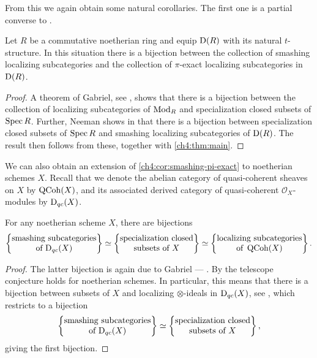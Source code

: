 
From this we again obtain some natural corollaries. The first one is a partial converse to \cite[2.13]{takahashi_2009}.

\begin{corollary}
    \label{ch4:cor:smashing-pi-exact}
    Let $R$ be a commutative noetherian ring and equip $\mathrm{D}(R)$ with its natural $t$-structure. In this situation there is a bijection between the collection of smashing localizing subcategories and the collection of $\pi$-exact localizing subcategories in $\mathrm{D}(R)$. 
\end{corollary}
\begin{proof}
    A theorem of Gabriel, see \cite[VI.2.4(b)]{gabriel_1962}, shows that there is a bijection between the collection of localizing subcategories of $\mathrm{Mod}_R$ and specialization closed subsets of $\operatorname{Spec} R$. Further, Neeman shows in \cite[3.3]{neeman_1992} that there is a bijection between specialization closed subsets of $\operatorname{Spec} R$ and smashing localizing subcategories of $\mathrm{D}(R)$. The result then follows from these, together with \cref{ch4:thm:main}. 
\end{proof}

We can also obtain an extension of \cref{ch4:cor:smashing-pi-exact} to noetherian schemes $X$. Recall that we denote the abelian category of quasi-coherent sheaves on $X$ by $\operatorname{QCoh}(X)$, and its associated derived category of quasi-coherent $\mathcal{O}_X$-modules by $\mathrm{D}_{qc}(X)$. 

\begin{lemma}
    For any noetherian scheme $X$, there are bijections
    \[\left\{ \begin{matrix} \text{smashing subcategories}\\ \text{of }\mathrm{D}_{qc}(X) \end{matrix} \right\}\simeq \left\{ \begin{matrix} \text{specialization closed}\\ \text{subsets of }X \end{matrix} \right\} \simeq \left\{ \begin{matrix} \text{localizing subcategories}\\ \text{of }\operatorname{QCoh}(X) \end{matrix} \right\}.\]
\end{lemma}
\begin{proof}
    The latter bijection is again due to Gabriel --- \cite[VI.2.4(b)]{gabriel_1962}. By \cite[4.13]{tarrio-lopez-salorio_2004} the telescope conjecture holds for noetherian schemes. In particular, this means that there is a bijection between subsets of $X$ and localizing $\otimes$-ideals in $\mathrm{D}_{qc}(X)$, see \cite[8.13]{stevenson_2013}, which restricts to a bijection
    \[\left\{ \begin{matrix} \text{smashing subcategories}\\ \text{of }\mathrm{D}_{qc}(X) \end{matrix} \right\}\simeq \left\{ \begin{matrix} \text{specialization closed}\\ \text{subsets of }X \end{matrix} \right\},\]
    giving the first bijection. 
\end{proof}

